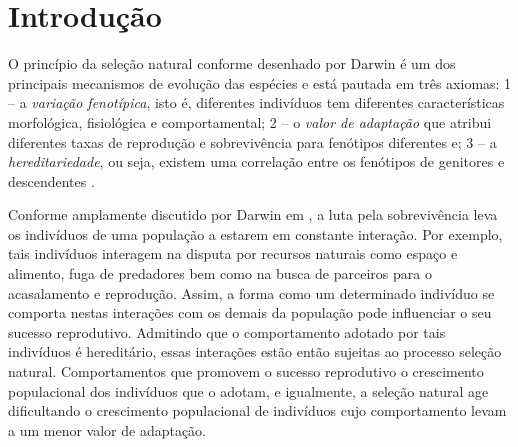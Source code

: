 \documentclass[
	12pt,				%
	openany,			%
	oneoside,			%
	a4paper,			%
	english,			%
	spanish,			%
	brazil,				%
	]{abntex2}
\begin{document}
\frenchspacing 


\imprimircapa

\imprimirfolhaderosto*

\tableofcontents*
\cleardoublepage


\textual

\chapter*[Introdução]{Introdução}

O princípio da seleção natural conforme desenhado por Darwin é um dos principais mecanismos de evolução das espécies e está pautada em três axiomas: 1 -- a \textit{variação fenotípica}, isto é, diferentes indivíduos tem diferentes características morfológica, fisiológica e comportamental;  2 -- o \textit{valor de adaptação} que atribui diferentes taxas de reprodução e sobrevivência para fenótipos diferentes e; 3 -- a \textit{hereditariedade}, ou seja, existem uma correlação entre os fenótipos de genitores e descendentes \cite{NOVBOOK}.

Conforme amplamente discutido por Darwin em \cite{DWBOOK}, a luta pela sobrevivência leva os indivíduos de uma população a estarem em constante interação. Por exemplo, tais indivíduos interagem na disputa por recursos naturais como espaço e alimento, fuga de predadores bem como na busca de parceiros para o acasalamento e reprodução.  Assim, a forma como um determinado indivíduo se comporta nestas interações com os demais da população pode influenciar o seu sucesso reprodutivo. Admitindo que o comportamento adotado por tais indivíduos é hereditário, essas interações estão então sujeitas ao processo seleção natural.  Comportamentos que promovem o sucesso reprodutivo o crescimento populacional dos indivíduos que o adotam,  e igualmente, a seleção natural age dificultando o crescimento populacional de indivíduos cujo comportamento levam a um menor valor de adaptação. 
\end{document}

